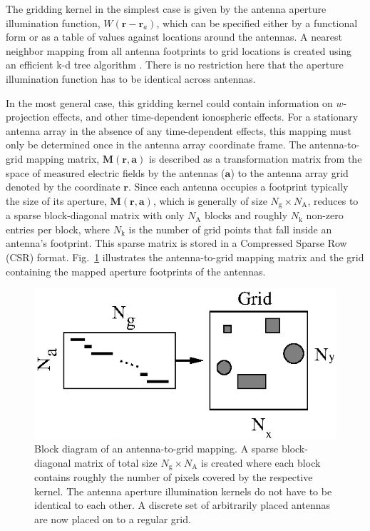 \documentclass[a4paper,fleqn,usenatbib]{mnras}
\newcommand{\Nant}{N_\textrm{A}}
\newcommand{\Ngrid}{N_\textrm{g}}
\begin{document}
The gridding kernel in the simplest case is given by the antenna aperture
illumination function, $W(\mathbf{r}-\mathbf{r}_a)$, which can
be specified either by a functional form or as a table of values against 
locations around the antennas. A nearest neighbor mapping from all antenna 
footprints to grid locations is created using an efficient k-d tree algorithm 
\citep{man99}. There is no restriction here that the aperture illumination 
function has to be identical across antennas. 

In the most general case, this gridding kernel could contain information on
$w$-projection effects, and other time-dependent ionospheric effects. For a
stationary antenna array in the absence of any time-dependent effects, this
mapping must only be determined once in the antenna array coordinate frame. The
antenna-to-grid mapping matrix, $\mathbf{M}(\mathbf{r},\mathbf{a})$ is described
as a transformation matrix from the space of measured electric fields by the 
antennas ($\mathbf{a}$) to the antenna array grid denoted by the coordinate 
$\mathbf{r}$. Since each antenna occupies a footprint typically the size of its 
aperture, $\mathbf{M}(\mathbf{r},\mathbf{a})$, which is generally of size
$\Ngrid\times \Nant$, reduces to a sparse block-diagonal matrix
with only $\Nant$ blocks and roughly $N_\textrm{k}$ non-zero entries per
block, where $N_\textrm{k}$ is the number of grid points that fall inside an
antenna's footprint. This sparse matrix is stored in a Compressed Sparse Row 
(CSR) format. Fig.~\ref{fig:a2g-mapping} illustrates the antenna-to-grid mapping
matrix and the grid containing the mapped aperture footprints of the antennas.

\begin{figure}
  \includegraphics[width=\columnwidth]{figure3}
  \caption{Block diagram of an antenna-to-grid mapping. A sparse block-diagonal
    matrix of total size $\Ngrid\times \Nant$ is created where each
    block contains roughly the number of pixels covered by the respective kernel.
    The antenna aperture illumination kernels do not have to be identical to each
    other. A discrete set of arbitrarily placed antennas are now placed on to a
    regular grid.}
  \label{fig:a2g-mapping}
\end{figure}
\end{document}
